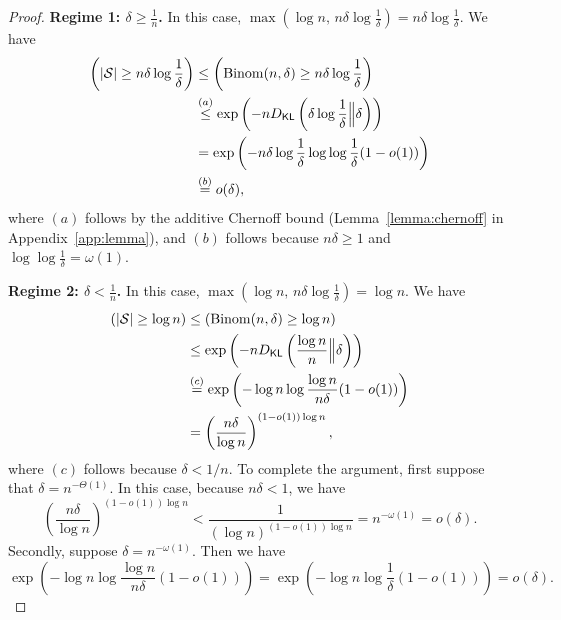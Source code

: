 \documentclass[journal, onecolumn]{IEEEtran}
\theoremstyle{plain}
\theoremstyle{definition}
\theoremstyle{remark}
\let\P\relax
\DeclareMathOperator\P{\mathsf{P}}
\begin{document}
\begin{proof}
    \vspace{0.25em}
    \noindent \textbf{Regime 1: $\delta\ge \frac{1}{n}$.} In this case, $\max(\log n, \,n\delta\log\frac{1}{\delta})=n\delta\log\frac{1}{\delta}$. We have
    \begin{align*}
        \P\left(|\mathcal{S}|\ge n\delta\log\frac{1}{\delta}\right)&\le \P\left(\mathrm{Binom}(n,\delta)\ge n\delta\log\frac{1}{\delta}\right)\\
        &\stackrel{(a)}{\le}\exp\left(-n D_{\mathsf{KL}}\left(\delta\log\frac{1}{\delta}\Big\|\delta\right)\right)\\
        &=\exp\left(-n \delta\log\frac{1}{\delta}\log\log\frac{1}{\delta}(1-o(1))\right)\\
        &\stackrel{(b)}{=}o(\delta),
    \end{align*}
    where $(a)$ follows by the additive Chernoff bound (Lemma~\ref{lemma:chernoff} in Appendix~\ref{app:lemma}), and $(b)$ follows because $n\delta\ge 1$ and $\log\log \frac{1}{\delta}=\omega(1)$.

    \vspace{0.25em}
    \noindent \textbf{Regime 2: $\delta<\frac{1}{n}$.} In this case, $\max(\log n, \, n\delta\log\frac{1}{\delta})=\log n$. We have
    \begin{align*}
        \P(|\mathcal{S}|\ge \log n)&\le \P\left(\mathrm{Binom}(n,\delta)\ge \log n\right)\\
        &\le \exp\left(-n D_{\mathsf{KL}}\left(\frac{\log n}{n}\Big\|\delta\right)\right)\\
        &\stackrel{(c)}{=}\exp\left(-\log n\log\frac{\log n}{n\delta}(1-o(1))\right)\\
        &=\left(\frac{n\delta}{\log n}\right)^{(1-o(1))\log n},
    \end{align*}
    where $(c)$ follows because $\delta<1/n$. To complete the argument, first suppose that $\delta=n^{-\Theta(1)}$. In this case, because $n\delta<1 $, we have $$\left(\frac{n\delta}{\log n}\right)^{(1-o(1))\log n}
    <\frac{1}{(\log n)^{(1-o(1))\log n}}=n^{-\omega(1)}=o(\delta).$$ Secondly, suppose $\delta=n^{-\omega(1)}$. Then we have
    \[\exp\left(-\log n\log\frac{\log n}{n\delta}(1-o(1))\right)=\exp\left(-\log n\log \frac{1}{\delta}(1-o(1))\right)=o(\delta).\]
\end{proof}


\vspace{0.5em}
\end{document}
